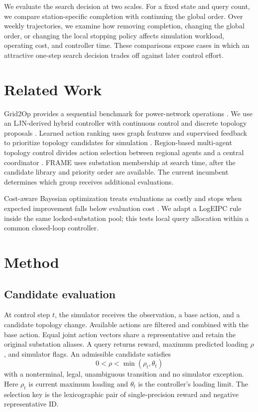 \documentclass[sigconf,review,anonymous]{acmart}
\begin{document}
We evaluate the search decision at two scales. For a fixed state and query count, we compare station-specific completion with continuing the global order. Over weekly trajectories, we examine how removing completion, changing the global order, or changing the local stopping policy affects simulation workload, operating cost, and controller time. These comparisons expose cases in which an attractive one-step search decision trades off against later control effort.

\section{Related Work}
Grid2Op provides a sequential benchmark for power-network operations \cite{marot2021}. We use an LJN-derived hybrid controller with continuous control and discrete topology proposals \cite{ljn}. Learned action ranking uses graph features and supervised feedback to prioritize topology candidates for simulation \cite{hassouna}. Region-based multi-agent topology control divides action selection between regional agents and a central coordinator \cite{demol2025}. FRAME uses substation membership at search time, after the candidate library and priority order are available. The current incumbent determines which group receives additional evaluations.

Cost-aware Bayesian optimization treats evaluations as costly and stops when expected improvement falls below evaluation cost \cite{xie2026}. We adapt a LogEIPC rule inside the same locked-substation pool; this tests local query allocation within a common closed-loop controller.

\section{Method}
\subsection{Candidate evaluation}
At control step \(t\), the simulator receives the observation, a base action, and a candidate topology change. Available actions are filtered and combined with the base action. Equal joint action vectors share a representative and retain the original substation aliases. A query returns reward, maximum predicted loading \(\rho\), and simulator flags. An admissible candidate satisfies
\[
0<\rho<\min(\rho_t,\theta_t)
\]
with a nonterminal, legal, unambiguous transition and no simulator exception. Here \(\rho_t\) is current maximum loading and \(\theta_t\) is the controller's loading limit. The selection key is the lexicographic pair of single-precision reward and negative representative ID.
\end{document}
